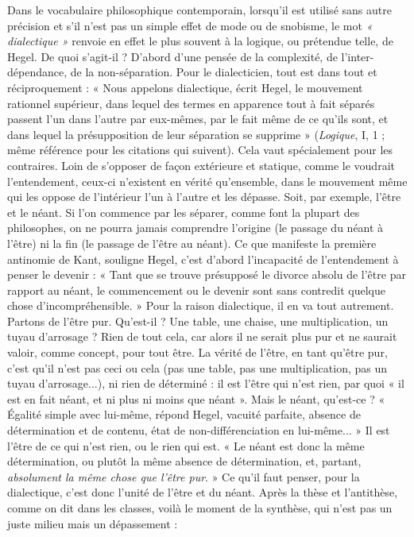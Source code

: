 Dans le vocabulaire philosophique contemporain, lorsqu'il est utilisé sans
autre précision et s’il n’est pas un simple effet de mode ou de snobisme, le mot
{\it « dialectique »} renvoie en effet le plus souvent à la logique, ou prétendue telle,
de Hegel. De quoi s'agit-il ? D'abord d’une pensée de la complexité, de l’inter-dépendance,
de la non-séparation. Pour le dialecticien, tout est dans tout et
réciproquement : « Nous appelons dialectique, écrit Hegel, le mouvement
rationnel supérieur, dans lequel des termes en apparence tout à fait séparés passent
l’un dans l’autre par eux-mêmes, par le fait même de ce qu’ils sont, et dans
lequel la présupposition de leur séparation se supprime » ({\it Logique}, I, 1 ; même
référence pour les citations qui suivent). Cela vaut spécialement pour les contraires.
Loin de s’opposer de façon extérieure et statique, comme le voudrait
l’entendement, ceux-ci n'existent en vérité qu’ensemble, dans le mouvement
même qui les oppose de l’intérieur l’un à l’autre et les dépasse. Soit, par
exemple, l'être et le néant. Si l’on commence par les séparer, comme font la
plupart des philosophes, on ne pourra jamais comprendre l’origine (le passage
du néant à l'être) ni la fin (le passage de l’être au néant). Ce que manifeste la
première antinomie de Kant, souligne Hegel, c’est d’abord l'incapacité de
l’entendement à penser le devenir : « Tant que se trouve présupposé le divorce
absolu de l’être par rapport au néant, le commencement ou le devenir sont sans
contredit quelque chose d’incompréhensible. » Pour la raison dialectique, il en
va tout autrement. Partons de l’être pur. Qu'est-il ? Une table, une chaise, une
multiplication, un tuyau d’arrosage ? Rien de tout cela, car alors il ne serait plus
pur et ne saurait valoir, comme concept, pour tout être. La vérité de l’être, en
tant qu'être pur, c’est qu'il n’est pas ceci ou cela (pas une table, pas une multiplication,
pas un tuyau d’arrosage...), ni rien de déterminé : il est l'être qui
n’est rien, par quoi « il est en fait néant, et ni plus ni moins que néant ». Mais
le néant, qu'est-ce ? « Égalité simple avec lui-même, répond Hegel, vacuité parfaite,
absence de détermination et de contenu, état de non-différenciation en
lui-même... » Il est l’être de ce qui n’est rien, ou le rien qui est. « Le néant est
donc la même détermination, ou plutôt la même absence de détermination, et,
partant, {\it absolument la même chose que l'être pur}. » Ce qu’il faut penser, pour la
dialectique, c’est donc l’unité de l’être et du néant. Après la thèse et l’antithèse,
comme on dit dans les classes, voilà le moment de la synthèse, qui n’est pas un
juste milieu mais un dépassement :

